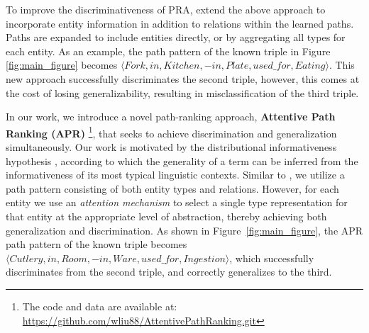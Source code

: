 \documentclass[letterpaper]{article} %
\begin{document}
To improve the discriminativeness of PRA, \cite{chains} extend the above approach to incorporate entity information in addition to relations within the learned paths. Paths are expanded to include entities directly, or by aggregating all types for each entity. As an example, the path pattern of the known triple in Figure \ref{fig:main_figure} becomes $\langle Fork, in, Kitchen, -in, Plate, used\_for, Eating \rangle$. This new approach successfully discriminates the second triple, however, this comes at the cost of losing generalizability, resulting in misclassification of the third triple.

In our work, we introduce a novel path-ranking approach, \textbf{Attentive Path Ranking (APR)} \footnote{The code and data are available at: \url{https://github.com/wliu88/AttentivePathRanking.git}}, that seeks to achieve discrimination and generalization simultaneously.  Our work is motivated by the distributional informativeness hypothesis \cite{santus2014hypernym}, according to which the generality of a term can be inferred from the informativeness of its most typical linguistic contexts.
Similar to \cite{chains}, we utilize a path pattern consisting of both entity types and relations.  However, for each entity
we use an \textit{attention mechanism} \cite{ntm} to select a single type representation for that entity at the appropriate level of abstraction, thereby achieving both generalization and discrimination. As shown in Figure~\ref{fig:main_figure}, the APR path pattern of the known triple becomes $\langle Cutlery, in, Room, -in, Ware, used\_for, Ingestion \rangle$, which successfully discriminates from the second triple, and correctly generalizes to the third.  

\end{document}

